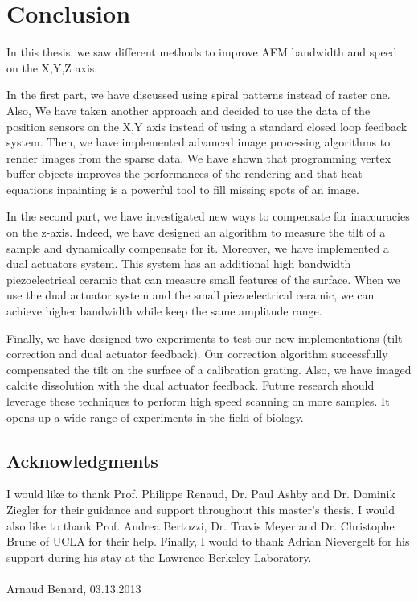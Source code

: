 \chapter{Conclusion}

In this thesis, we saw different methods to improve AFM bandwidth and speed on the X,Y,Z axis. 

In the first part, we have discussed using spiral patterns instead of raster one. Also, We have taken another approach and decided to use the data of the position sensors on the X,Y axis instead of using a standard closed loop feedback system. Then, we have implemented advanced image processing algorithms to render images from the sparse data. We have shown that programming vertex buffer objects improves the performances of the rendering and that heat equations inpainting is a powerful tool to fill missing spots of an image.

In the second part, we have investigated new ways to compensate for inaccuracies on the z-axis. Indeed, we have designed an algorithm to measure the tilt of a sample and dynamically compensate for it. Moreover, we have implemented a dual actuators system. This system has an additional high bandwidth piezoelectrical ceramic that can measure small features of the surface. When we use the dual actuator system and the small piezoelectrical ceramic, we can achieve higher bandwidth while keep the same amplitude range.

Finally, we have designed two experiments to test our new implementations (tilt correction and dual actuator feedback). Our correction algorithm successfully compensated the tilt on the surface of a calibration grating. Also, we have imaged calcite dissolution with the dual actuator feedback. Future research should leverage these techniques to perform high speed scanning on more samples. It opens up a wide range of experiments in the field of biology.

\section{Acknowledgments}

I would like to thank Prof. Philippe Renaud, Dr. Paul Ashby and Dr. Dominik Ziegler for their guidance and support throughout this master's thesis. I would also like to thank Prof. Andrea Bertozzi, Dr. Travis Meyer and Dr. Christophe Brune of UCLA for their help. Finally, I would to thank Adrian Nievergelt for his support during his stay at the Lawrence Berkeley Laboratory.
 \\ \\
Arnaud Benard, 03.13.2013